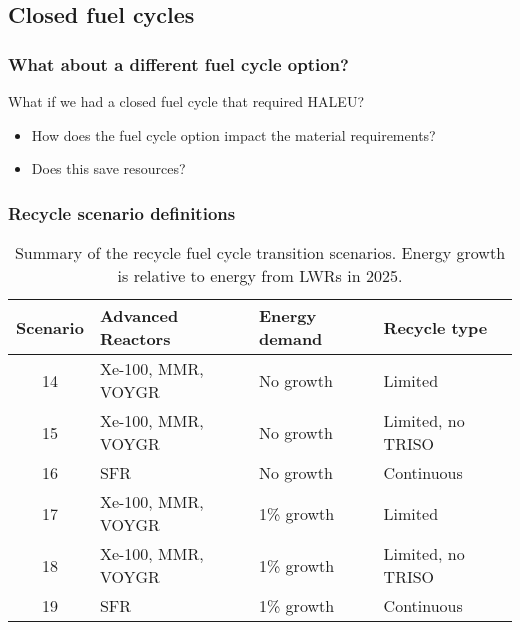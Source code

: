 \subsection{Closed fuel cycles}
\begin{frame}
    \frametitle{What about a different fuel cycle option?}
    What if we had a closed fuel cycle that required \gls{HALEU}?
    \begin{itemize}
        \item How does the fuel cycle option impact the material requirements?
        \item Does this save resources?
    \end{itemize}

\end{frame}

\begin{frame}
    \frametitle{Recycle scenario definitions}
    \begin{table}[ht]
        \centering
        \caption{Summary of the recycle fuel cycle transition scenarios.
        Energy growth is relative to energy from \glspl{LWR} in 2025.}
        \label{tab:scenarios_recycle}
        \begin{tabular}{c l l l}
            \hline
            Scenario & Advanced Reactors & Energy demand & Recycle type\\\hline
            \rowcolor{lightorange}14 & Xe-100, MMR, VOYGR & No growth & Limited \\
            \rowcolor{lightorange}15 & Xe-100, MMR, VOYGR & No growth & Limited, no TRISO\\
            \rowcolor{lightorange}16 & SFR& No growth & Continuous \\
            \rowcolor{lightpink}17 & Xe-100, MMR, VOYGR& 1\% growth & Limited \\
            \rowcolor{lightpink}18 & Xe-100, MMR, VOYGR & 1\% growth & Limited, no TRISO\\
            \rowcolor{lightpink}19 & SFR & 1\% growth & Continuous\\
            \hline
    \end{tabular}
    \end{table}
\end{frame}

